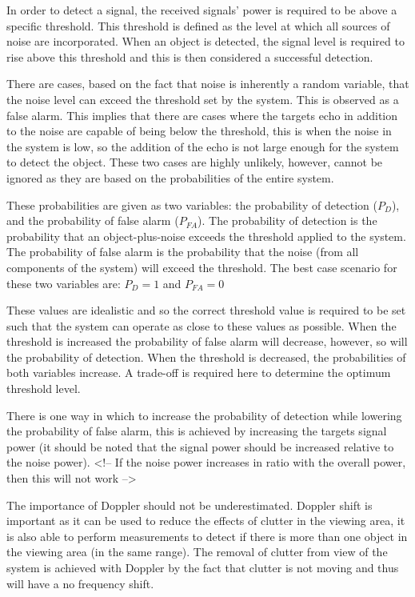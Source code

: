 \documentclass[11pt]{witseiepaper}
\begin{document}
In order to detect a signal, the received signals' power is required to be above a specific threshold. This threshold is defined as the level at which all sources of noise are incorporated. When an object is detected, the signal level is required to rise above this threshold and this is then considered a successful detection.

There are cases, based on the fact that noise is inherently a random variable, that the noise level can exceed the threshold set by the system. This is observed as a false alarm.
This implies that there are cases where the targets echo in addition to the noise are capable of being below the threshold, this is when the noise in the system is low, so the addition of the echo is not large enough for the system to detect the object.
These two cases are highly unlikely, however, cannot be ignored as they are based on the probabilities of the entire system.

These probabilities are given as two variables: the probability of detection ($P_{D}$), and the probability of false alarm ($P_{FA}$). The probability of detection is the probability that an object-plus-noise exceeds the threshold applied to the system. The probability of false alarm is the probability that the noise (from all components of the system) will exceed the threshold.
The best case scenario for these two variables are: 
$P_{D} = 1$
and
$P_{FA} = 0$

These values are idealistic and so the correct threshold value is required to be set such that the system can operate as close to these values as possible.
When the threshold is increased the probability of false alarm will decrease, however, so will the probability of detection. When the threshold is decreased, the probabilities of both variables increase. A trade-off is required here to determine the optimum threshold level.

There is one way in which to increase the probability of detection while lowering the probability of false alarm, this is achieved by increasing the targets signal power (it should be noted that the signal power should be increased relative to the noise power). 
<!-- If the noise power increases in ratio with the overall power, then this will not work -->

The importance of Doppler should not be underestimated. Doppler shift is important as it can be used to reduce the effects of clutter in the viewing area, it is also able to perform measurements to detect if there is more than one object in the viewing area (in the same range). The removal of clutter from view of the system is achieved with Doppler by the fact that clutter is not moving and thus will have a no frequency shift.
\end{document}
